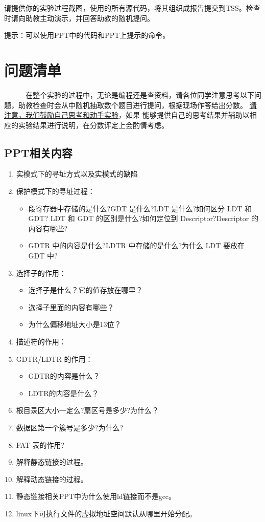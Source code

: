 \documentclass[a4paper]{article}
\begin{document}
请提供你的实验过程截图，使用的所有源代码，将其组织成报告提交到TSS。检查时请向助教主动演示，并回答助教的随机提问。

提示：可以使用PPT中的代码和PPT上提示的命令。


\section{问题清单}
~~~~~~在整个实验的过程中，无论是编程还是查资料，请各位同学注意思考以下问题，助教检查时会从中随机抽取数个题目进行提问，根据现场作答给出分数。
\underline{请注意，我们鼓励自己思考和动手实验}，如果
能够提供自己的思考结果并辅助以相应的实验结果进行说明，在分数评定上会酌情考虑。

\subsection{PPT相关内容}
\begin{enumerate}
	\item 实模式下的寻址方式以及实模式的缺陷
	\item 保护模式下的寻址过程：
	\begin{itemize}
		\item 段寄存器中存储的是什么?GDT 是什么?LDT 是什么?如何区分 LDT 和 GDT? LDT 和 GDT 的区别是什么?如何定位到 Descriptor?Descriptor 的内容有哪些?
		\item GDTR 中的内容是什么?LDTR 中存储的是什么?为什么 LDT 要放在 GDT 中?
	\end{itemize}
	\item 选择子的作用：
		\begin{itemize}
			\item 选择子是什么？它的值存放在哪里？
			\item 选择子里面的内容有哪些？
			\item 为什么偏移地址大小是13位？
		\end{itemize}
	\item 描述符的作用：
	\item GDTR/LDTR 的作用：
		\begin{itemize}
			\item GDTR的内容是什么？
			\item LDTR的内容是什么？
		\end{itemize}
	\item 根目录区大小一定么?扇区号是多少?为什么？
	\item 数据区第一个簇号是多少?为什么?
	\item FAT 表的作用?
	\item 解释静态链接的过程。
	\item 解释动态链接的过程。
	\item 静态链接相关PPT中为什么使用ld链接而不是gcc。
	\item linux下可执行文件的虚拟地址空间默认从哪里开始分配。
\end{enumerate}
\end{document}

